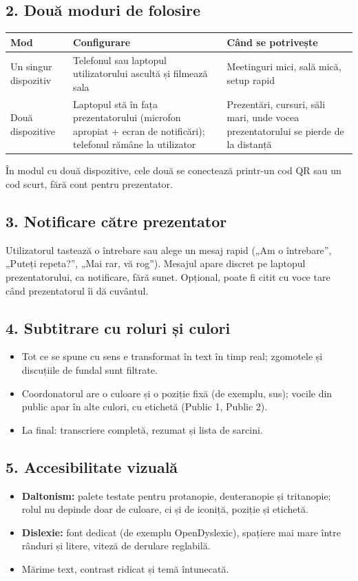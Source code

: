 \documentclass[11pt,a4paper]{article}
\begin{document}
\subsection*{2. Două moduri de folosire}
\begin{center}
\begin{tabularx}{\textwidth}{>{\raggedright\arraybackslash}p{3cm} L L}
\toprule
\textbf{Mod} & \textbf{Configurare} & \textbf{Când se potrivește} \\
\midrule
Un singur dispozitiv & Telefonul sau laptopul utilizatorului ascultă și filmează sala & Meetinguri mici, sală mică, setup rapid \\
Două dispozitive & Laptopul stă în fața prezentatorului (microfon apropiat + ecran de notificări); telefonul rămâne la utilizator & Prezentări, cursuri, săli mari, unde vocea prezentatorului se pierde de la distanță \\
\bottomrule
\end{tabularx}
\end{center}
În modul cu două dispozitive, cele două se conectează printr-un cod QR sau un cod scurt, fără cont pentru prezentator.

\subsection*{3. Notificare către prezentator}
Utilizatorul tastează o întrebare sau alege un mesaj rapid („Am o întrebare”, „Puteți repeta?”, „Mai rar, vă rog”). Mesajul apare discret pe laptopul prezentatorului, ca notificare, fără sunet. Opțional, poate fi citit cu voce tare când prezentatorul îi dă cuvântul.

\subsection*{4. Subtitrare cu roluri și culori}
\begin{itemize}
  \item Tot ce se spune cu sens e transformat în text în timp real; zgomotele și discuțiile de fundal sunt filtrate.
  \item Coordonatorul are o culoare și o poziție fixă (de exemplu, sus); vocile din public apar în alte culori, cu etichetă (Public 1, Public 2).
  \item La final: transcriere completă, rezumat și lista de sarcini.
\end{itemize}

\subsection*{5. Accesibilitate vizuală}
\begin{itemize}
  \item \textbf{Daltonism:} palete testate pentru protanopie, deuteranopie și tritanopie; rolul nu depinde doar de culoare, ci și de iconiță, poziție și etichetă.
  \item \textbf{Dislexie:} font dedicat (de exemplu OpenDyslexic), spațiere mai mare între rânduri și litere, viteză de derulare reglabilă.
  \item Mărime text, contrast ridicat și temă întunecată.
\end{itemize}
\end{document}
